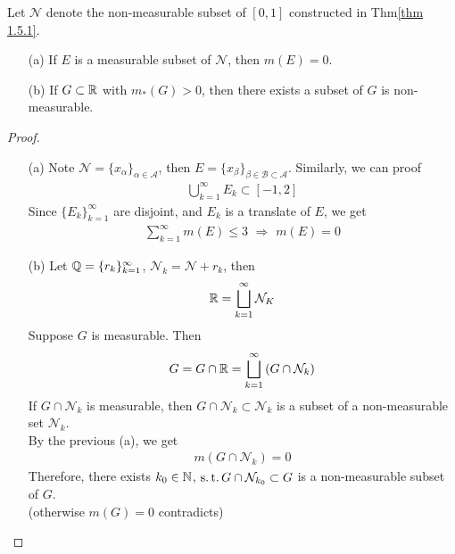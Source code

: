 	\begin{proposition}\label{prop 1.5.1}
		Let $\mathcal{N}$ denote the non-measurable subset of $[0 , 1]$ constructed in Thm\ref{thm 1.5.1}.
		\begin{enumerate}
			\item[(a)]If $E$ is a measurable subset of $\mathcal{N}$, then $m(E) = 0$.
			
			\item[(b)]If $G \subset \mathbb{R}$ with $m_{*}(G) > 0$, then there exists a subset of $G$ is non-measurable.
		\end{enumerate}
	
		\vspace{2em}
		\begin{proof}
			\begin{enumerate}
				\item[(a)]Note $\mathcal{N} = \{ x_\alpha \}_{\alpha \in \mathcal{A}}$, then $E = \{ x_\beta \}_{\beta \in \mathcal{B} \subset \mathcal{A}}$. Similarly, we can proof
				\begin{align}
					\bigcup_{k = 1}^{\infty}{E_k} \subset [-1 , 2]
				\end{align}
				Since $\{ E_k \}_{k = 1}^{\infty}$ are disjoint, and $E_k$ is a translate of $E$, we get
				\begin{align}
					\sum_{k = 1}^{\infty}{m(E)} \leq 3 \,\, \Rightarrow \,\, m(E) = 0
				\end{align}
			
				\item[(b)]Let $\mathbb{Q} = \{ r_k \}_{k = 1}^{\infty}$, $\mathcal{N}_k = \mathcal{N} + r_k$, then
				\begin{align}
					\mathbb{R} = \bigsqcup_{k = 1}^{\infty}{\mathcal{N}_K}
				\end{align}
				Suppose $G$ is measurable. Then
				\begin{align}
					G = G \cap \mathbb{R} = \bigsqcup_{k = 1}^{\infty}{(G \cap \mathcal{N}_k)}
				\end{align}
				If $G \cap \mathcal{N}_k$ is measurable, then $G \cap \mathcal{N}_k \subset \mathcal{N}_k$ is a subset of a non-measurable set $\mathcal{N}_k$.\\
				By the previous (a), we get
				\begin{align}
					m(G \cap \mathcal{N}_k) = 0
				\end{align}
				Therefore, there exists $k_0 \in \mathbb{N}$, $\operatorname{s.t.} G \cap \mathcal{N}_{k_0} \subset G$ is a non-measurable subset of $G$.\\
				(otherwise $m(G) = 0$ contradicts)
			\end{enumerate}
		\end{proof}
	\end{proposition}

